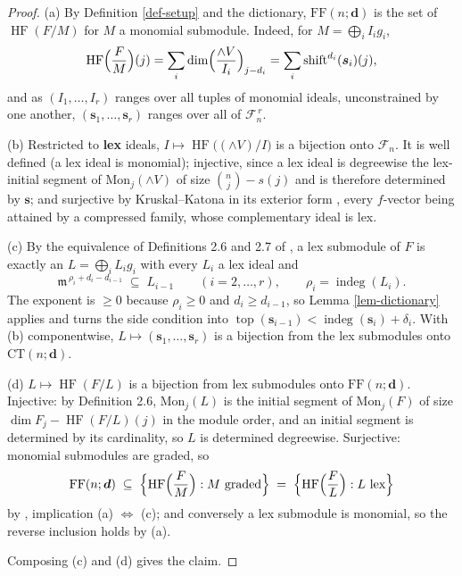 \documentclass[11pt, a4paper, abstract=yes]{scrartcl}
\theoremstyle{definition}
\theoremstyle{remark}
\theoremstyle{plain}
\newcommand{\vek}[1]{\boldsymbol{#1}}
\newcommand{\shift}{\operatorname{shift}}
\newcommand{\indeg}{\operatorname{indeg}}
\newcommand{\tp}{\operatorname{top}}
\newcommand{\HF}{\operatorname{HF}}
\newcommand{\Ext}{\mathord{\wedge }V}
\let\autocite\cite
\begin{document}
\begin{proof}
(a) By Definition \ref{def-setup} and the dictionary, \(\mathrm{FF}(n;\vek d)\) is the set of \(\HF(F/M)\)
for \(M\) a monomial submodule. Indeed, for \(M=\bigoplus_iI_ig_i\),
\[
  \HF\Bigl(\frac FM\Bigr)(j)=\sum_i\dim\Bigl(\frac{\Ext}{I_i}\Bigr)_{j-d_i}
    =\sum_i\shift^{d_i}(\vek s_i)(j) ,
\]
and as \((I_1,\dots,I_r)\) ranges over all tuples of monomial ideals, unconstrained by one another,
\((\vek s_1,\dots,\vek s_r)\) ranges over all of \(\mathcal F_n^{\,r}\).

(b) Restricted to \textbf{lex} ideals, \(I\mapsto\HF\bigl((\Ext)/I\bigr)\) is a bijection onto \(\mathcal F_n\). It is well
defined (a lex ideal is monomial); injective, since a lex ideal is degreewise the lex-initial segment
of \(\mathrm{Mon}_j(\Ext)\) of size \(\binom nj-s(j)\) and is therefore determined by \(\vek s\); and
surjective by Kruskal--Katona in its exterior form \autocite[Theorem 4.1]{AramovaHerzogHibi1997}, every \(f\)-vector being attained by a compressed
family, whose complementary ideal is lex.

(c) By the equivalence of Definitions 2.6 and 2.7 of \autocite{AmataCrupi2020KK}, a lex submodule of \(F\) is exactly
an \(L=\bigoplus_iL_ig_i\) with every \(L_i\) a lex ideal and
\[
  \mathfrak m^{\,\rho_i+d_i-d_{i-1}}\;\subseteq\;L_{i-1}
  \qquad (i=2,\dots,r),\qquad \rho_i=\indeg(L_i) .
\]
The exponent is \(\ge0\) because \(\rho_i\ge0\) and \(d_i\ge d_{i-1}\), so
Lemma \ref{lem-dictionary} applies and turns the side condition into
\(\tp(\vek s_{i-1})<\indeg(\vek s_i)+\delta_i\). With (b) componentwise, \(L\mapsto(\vek s_1,\dots,\vek s_r)\) is a
bijection from the lex submodules onto \(\mathrm{CT}(n;\vek d)\).

(d) \(L\mapsto\HF(F/L)\) is a bijection from lex submodules onto \(\mathrm{FF}(n;\vek d)\). Injective: by
Definition 2.6, \(\mathrm{Mon}_j(L)\) is the initial segment of \(\mathrm{Mon}_j(F)\) of size
\(\dim F_j-\HF(F/L)(j)\) in the module order, and an initial segment is determined by its
cardinality, so \(L\) is determined degreewise. Surjective: monomial submodules are graded, so
\begin{equation}\label{eq:FF-in-lex}
  \mathrm{FF}(n;\vek d)\;\subseteq\;\Bigl\lbrace\HF\Bigl(\frac FM\Bigr):M\ \text{graded}\Bigr\rbrace
  \;=\;\Bigl\lbrace\HF\Bigl(\frac FL\Bigr):L\ \text{lex}\Bigr\rbrace
\end{equation}
by \autocite[Theorem 4.2]{AmataCrupi2020KK}, implication (a) \(\Leftrightarrow\) (c); and conversely a lex
submodule is monomial, so the reverse inclusion holds by (a).

Composing (c) and (d) gives the claim.
\end{proof}
\end{document}
